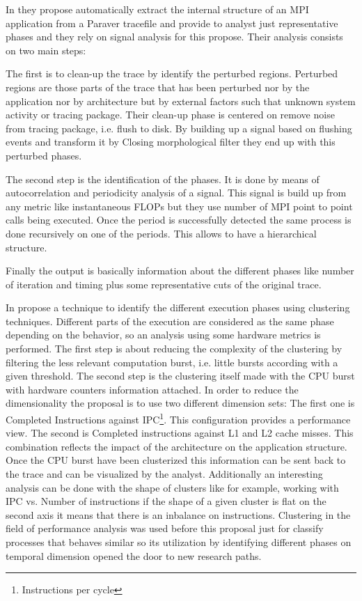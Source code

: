 In \cite{casas2007automatic} they propose 
automatically extract the internal structure of an MPI application from a
Paraver tracefile and provide to analyst just representative phases and they 
rely on signal analysis for this propose. 
Their analysis consists on two main steps:
\begin{enumerate*}[label=\roman*)]
    \item The first is to clean-up the trace by identify the perturbed regions.
Perturbed regions are those parts of the trace that has been perturbed nor by
the application nor by architecture but by external factors such that unknown
system activity or tracing package. Their clean-up phase is centered on remove
noise from tracing package, i.e. flush to disk. By building up a signal based
on flushing events and transform it by Closing morphological filter they end up
with this perturbed phases. 
    \item The second step is the identification of the
phases. It is done by means of autocorrelation and periodicity analysis of a
signal. This signal is build up from any metric like instantaneous FLOPs but
they use number of MPI point to point calls being executed. Once the period is
successfully detected the same process is done recursively on one of the
periods. This allows to have a hierarchical structure. 
\end{enumerate*}
Finally the output is
basically information about the different phases like number of iteration and
timing plus some representative cuts of the original trace. 

In \cite{gonzalez2013application} propose a
technique to identify the different execution phases using clustering 
techniques. Different parts of the
execution are considered as the same phase depending on the behavior,
so an analysis using some hardware metrics is
performed. The first step is about reducing the complexity of the clustering by
filtering the less relevant computation burst, i.e. little bursts according
with a given threshold. The second step is the clustering itself made with the 
CPU burst with hardware counters information attached. In order to 
reduce the dimensionality the proposal is to
use two different dimension sets: The first one is Completed Instructions
against IPC\footnote{Instructions per cycle}. This configuration provides a
performance view. The second is Completed instructions against L1 and L2 cache
misses. This combination reflects the impact of the architecture on the
application structure. Once the CPU burst have been clusterized this information
can be sent back to the trace and can be visualized by the analyst. Additionally
an interesting analysis can be done with the shape of clusters like for example,
working with IPC vs. Number of instructions if the shape of a given cluster is
flat on the second axis it means that there is an inbalance on instructions.
Clustering in the field of performance analysis was used before this proposal 
just for classify processes that behaves similar so its utilization by
identifying different phases on temporal dimension opened the door to new research
paths.


